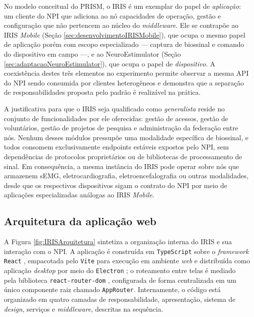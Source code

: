 No modelo conceitual do PRISM, o IRIS é um exemplar do papel de \textit{aplicação}: um cliente do NPI que adiciona ao nó capacidades de operação, gestão e configuração que não pertencem ao núcleo do \textit{middleware}. Ele se contrapõe ao IRIS \textit{Mobile} (Seção \ref{sec:desenvolvimentoIRISMobile}), que ocupa o mesmo papel de aplicação porém com escopo especializado --- captura de biossinal e comando do dispositivo em campo ---, e ao NeuroEstimulator (Seção \ref{sec:adaptacaoNeuroEstimulator}), que ocupa o papel de \textit{dispositivo}. A coexistência destes três elementos no experimento permite observar a mesma API do NPI sendo consumida por clientes heterogêneos e demonstra que a separação de responsabilidades proposta pelo padrão é realizável na prática.

A justificativa para que o IRIS seja qualificado como \textit{generalista} reside no conjunto de funcionalidades por ele oferecidas: gestão de acessos, gestão de voluntários, gestão de projetos de pesquisa e administração da federação entre nós. Nenhum desses módulos pressupõe uma modalidade específica de biossinal, e todos consomem exclusivamente endpoints estáveis expostos pelo NPI, sem dependências de protocolos proprietários ou de bibliotecas de processamento de sinal. Em consequência, a mesma instância do IRIS pode operar sobre nós que armazenem sEMG, eletrocardiografia, eletroencefalografia ou outras modalidades, desde que os respectivos dispositivos sigam o contrato do NPI por meio de aplicações especializadas análogas ao IRIS \textit{Mobile}.

\subsection{Arquitetura da aplicação web}\label{subsec:IRISArquitetura}

A Figura \ref{fig:IRISArquitetura} sintetiza a organização interna do IRIS e sua interação com o NPI. A aplicação é construída em \texttt{TypeScript} \cite{typescriptDocs} sobre o \textit{framework} \texttt{React} \cite{reactDocs}, empacotada pelo \texttt{Vite} \cite{viteDocs} para execução em ambiente \textit{web} e distribuída como aplicação \textit{desktop} por meio do \texttt{Electron} \cite{electronDocs}; o roteamento entre telas é mediado pela biblioteca \texttt{react-router-dom} \cite{reactRouterDocs}, configurada de forma centralizada em um único componente raiz chamado \texttt{AppRouter}. Internamente, o código está organizado em quatro camadas de responsabilidade, apresentação, sistema de \textit{design}, serviços e \textit{middleware}, descritas na sequência.

